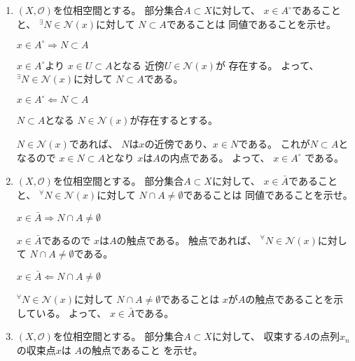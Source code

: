 \documentclass[12pt,b5paper]{ltjsarticle}
\begin{document}
\begin{enumerate}
 \item
      $(X,\mathcal{O})$を位相空間とする。
      部分集合$A\subset X$に対して、
      $x\in A^{\circ}$であることと、
      ${}^{\exists} N \in \mathcal{N}(x)$に対して
      $N\subset A$であることは
      同値であることを示せ。

      \dotfill

      $x\in A^{\circ} \Rightarrow N\subset A$

      $x\in A^{\circ}$より
      $x\in U \subset A$となる
      近傍$U\in\mathcal{N}(x)$が
      存在する。
      よって、
      ${}^{\exists} N \in \mathcal{N}(x)$に対して
      $N\subset A$である。

      $x\in A^{\circ} \Leftarrow N\subset A$

      $N\subset A$となる
      $N \in \mathcal{N}(x)$が存在するとする。

      $N \in \mathcal{N}(x)$であれば、
      $N$は$x$の近傍であり、$x\in N$である。
      これが$N\subset A$となるので
      $x\in N \subset A$となり
      $x$は$A$の内点である。
      よって、
      $x\in A^{\circ}$
      である。

      \hrulefill

 \item
      $(X,\mathcal{O})$を位相空間とする。
      部分集合$A\subset X$に対して、
      $x\in \bar{A}$であることと、
      ${}^{\forall}N \in \mathcal{N}(x)$に対して
      $N\cap A \ne\emptyset$であることは
      同値であることを示せ。

      \dotfill

      $x\in \bar{A} \Rightarrow N\cap A \ne\emptyset$

      $x\in \bar{A}$であるので
      $x$は$A$の触点である。
      触点であれば、
      ${}^{\forall}N \in \mathcal{N}(x)$に対して
      $N\cap A \ne\emptyset$である。

      $x\in \bar{A} \Leftarrow N\cap A \ne\emptyset$

      ${}^{\forall}N \in \mathcal{N}(x)$に対して
      $N\cap A \ne\emptyset$であることは
      $x$が$A$の触点であることを示している。
      よって、
      $x\in\bar{A}$である。


      \hrulefill

 \item
      $(X,\mathcal{O})$を位相空間とする。
      部分集合$A\subset X$に対して、
      収束する$A$の点列$x_n$の収束点$x$は
      $A$の触点であること
      を示せ。

      \dotfill


\end{enumerate}
\end{document}
